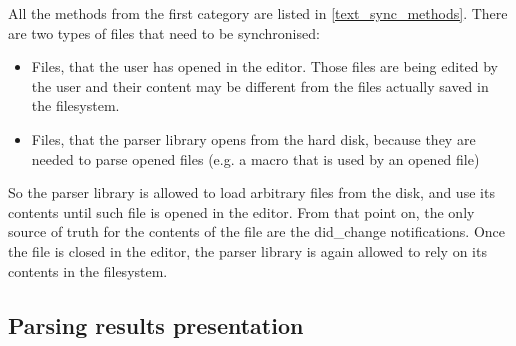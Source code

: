 All the methods from the first category are listed in \cref{text_sync_methods}. There are two types of files that need to be synchronised:
\begin{itemize}
	\item Files, that the user has opened in the editor. Those files are being edited by the user and their content may be different from the files actually saved in the filesystem.
	\item Files, that the parser library opens from the hard disk, because they are needed to parse opened files (e.g. a macro that is used by an opened file)
\end{itemize}

So the parser library is allowed to load arbitrary files from the disk, and use its contents until such file is opened in the editor. From that point on, the only source of truth for the contents of the file are the did\_change notifications. Once the file is closed in the editor, the parser library is again allowed to rely on its contents in the filesystem.



\subsection{Parsing results presentation}

